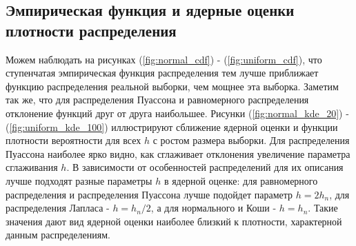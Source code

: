 \documentclass[../body.tex]{subfiles}
\begin{document}
	\subsection{Эмпирическая функция и ядерные оценки плотности распределения}
	Можем наблюдать на рисунках (\ref{fig:normal_cdf}) - (\ref{fig:uniform_cdf}), что ступенчатая эмпирическая функция распределения тем лучше приближает функцию распределения реальной выборки, чем мощнее эта выборка. Заметим так же, что для распределения Пуассона и равномерного распределения отклонение функций друг от друга наибольшее.
	\newline
	Рисунки (\ref{fig:normal_kde_20}) - (\ref{fig:uniform_kde_100}) иллюстрируют сближение ядерной оценки и функции плотности вероятности для всех $h$ с ростом размера выборки. Для распределения Пуассона наиболее ярко видно, как сглаживает отклонения увеличение параметра сглаживания $h$.
	\newline
	В зависимости от особенностей распределений для их описания лучше подходят разные параметры $h$ в ядерной оценке: для равномерного распределения и распределения Пуассона лучше подойдет параметр $h = 2h_n$, для распределения Лапласа  - $h = h_n/2$, а для нормального и Коши - $h = h_n$.
	Такие значения дают вид ядерной оценки наиболее близкий к плотности, характерной данным распределениям.
\end{document}
